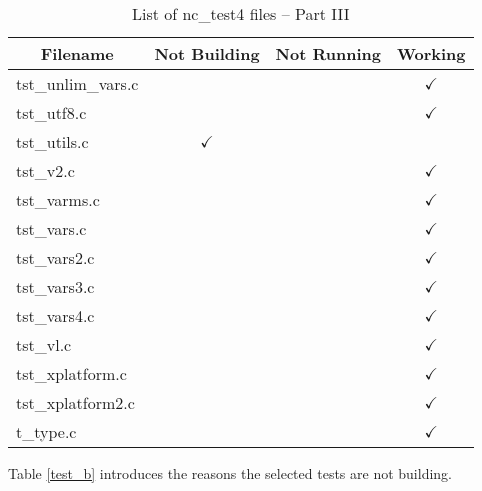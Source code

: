\begin{table}[H]
\centering
\begin{tabular}{|l|c|c|c|}
\hline
\multicolumn{1}{c|}{\parbox{6cm}{\centering Filename}} & \multicolumn{1}{c|}{Not Building} & \multicolumn{1}{c|}{Not Running} & \multicolumn{1}{c|}{Working} \\ \hline \hline
tst\_unlim\_vars.c      &               &               & $\checkmark$    \\ \hline
tst\_utf8.c             &               &               & $\checkmark$    \\ \hline
tst\_utils.c            & $\checkmark$  &               &                 \\ \hline
tst\_v2.c               &               &               & $\checkmark$    \\ \hline
tst\_varms.c            &               &               & $\checkmark$    \\ \hline
tst\_vars.c             &               &               & $\checkmark$    \\ \hline
tst\_vars2.c            &               &               & $\checkmark$    \\ \hline
tst\_vars3.c            &               &               & $\checkmark$    \\ \hline
tst\_vars4.c            &               &               & $\checkmark$    \\ \hline
tst\_vl.c               &               &               & $\checkmark$    \\ \hline
tst\_xplatform.c        &               &               & $\checkmark$    \\ \hline
tst\_xplatform2.c       &               &               & $\checkmark$    \\ \hline
t\_type.c               &               &               & $\checkmark$    \\ \hline
\hline
\end{tabular}
\caption{\label{tab:nc_test4_3} List of nc\_test4 files -- Part III}
\end{table}

Table \ref{test_b} introduces the reasons the selected tests are not building.

